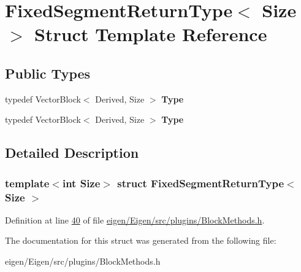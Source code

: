 \hypertarget{struct_fixed_segment_return_type}{}\section{Fixed\+Segment\+Return\+Type$<$ Size $>$ Struct Template Reference}
\label{struct_fixed_segment_return_type}
\subsection*{Public Types}
\begin{DoxyCompactItemize}
\item 
\mbox{\label{struct_fixed_segment_return_type_ac2d746820a67369c7398ad083d752047}} 
typedef Vector\+Block$<$ Derived, Size $>$ {\bfseries Type}
\item 
\mbox{\label{struct_fixed_segment_return_type_ac2d746820a67369c7398ad083d752047}} 
typedef Vector\+Block$<$ Derived, Size $>$ {\bfseries Type}
\end{DoxyCompactItemize}


\subsection{Detailed Description}
\subsubsection*{template$<$int Size$>$\newline
struct Fixed\+Segment\+Return\+Type$<$ Size $>$}



Definition at line \hyperlink{eigen_2_eigen_2src_2plugins_2_block_methods_8h_source_l00040}{40} of file \hyperlink{eigen_2_eigen_2src_2plugins_2_block_methods_8h_source}{eigen/\+Eigen/src/plugins/\+Block\+Methods.\+h}.



The documentation for this struct was generated from the following file\+:\begin{DoxyCompactItemize}
\item 
eigen/\+Eigen/src/plugins/\+Block\+Methods.\+h\end{DoxyCompactItemize}
